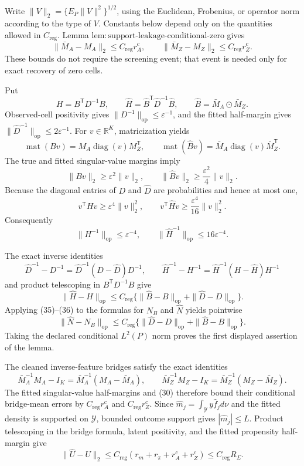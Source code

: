 Write \(\|V\|_2=\{E_P\|V\|^2\}^{1/2}\), using the Euclidean, Frobenius, or operator norm according to the type of \(V\).  Constants below depend only on the quantities allowed in \(C_{\mathrm{reg}}\).  Lemma \(\mathrm{lem{:}support\mbox{-}leakage\mbox{-}conditional\mbox{-}zero}\) gives
\[
 \|\bar M_A-M_A\|_2\leq C_{\mathrm{reg}}r_A^c,
 \qquad
 \|\bar M_Z-M_Z\|_2\leq C_{\mathrm{reg}}r_Z^c. \tag{30}
\]
These bounds do not require the screening event; that event is needed only for exact recovery of zero cells.

Put
\[
 H=B^{\mathsf T}D^{-1}B,\qquad
 \widehat H=\widehat B^{\mathsf T}\widehat D^{-1}\widehat B,
 \qquad \widehat B=\bar M_A\odot\bar M_Z. \tag{31}
\]
Observed-cell positivity gives \(\|D^{-1}\|_{\mathrm{op}}\leq\varepsilon^{-1}\), and the fitted half-margin gives \(\|\widehat D^{-1}\|_{\mathrm{op}}\leq2\varepsilon^{-1}\).  For \(v\in\mathbb R^K\), matricization yields
\[
 \operatorname{mat}(Bv)=M_A\operatorname{diag}(v)M_Z^{\mathsf T},
 \qquad
 \operatorname{mat}(\widehat Bv)=\bar M_A\operatorname{diag}(v)\bar M_Z^{\mathsf T}. \tag{32}
\]
The true and fitted singular-value margins imply
\[
 \|Bv\|_2\geq\varepsilon^2\|v\|_2,
 \qquad
 \|\widehat Bv\|_2\geq\frac{\varepsilon^2}{4}\|v\|_2. \tag{33}
\]
Because the diagonal entries of \(D\) and \(\widehat D\) are probabilities and hence at most one,
\[
 v^{\mathsf T}Hv\geq\varepsilon^4\|v\|_2^2,\qquad
 v^{\mathsf T}\widehat Hv\geq\frac{\varepsilon^4}{16}\|v\|_2^2.
\]
Consequently
\[
 \|H^{-1}\|_{\mathrm{op}}\leq\varepsilon^{-4},
 \qquad
 \|\widehat H^{-1}\|_{\mathrm{op}}\leq16\varepsilon^{-4}. \tag{34}
\]

The exact inverse identities
\[
 \widehat D^{-1}-D^{-1}=\widehat D^{-1}(D-\widehat D)D^{-1},
 \qquad
 \widehat H^{-1}-H^{-1}=\widehat H^{-1}(H-\widehat H)H^{-1} \tag{35}
\]
and product telescoping in \(B^{\mathsf T}D^{-1}B\) give
\[
 \|\widehat H-H\|_{\mathrm{op}}
 \leq C_{\mathrm{reg}}
 \{\|\widehat B-B\|_{\mathrm{op}}+\|\widehat D-D\|_{\mathrm{op}}\}. \tag{36}
\]
Applying (35)--(36) to the formulas for \(N_B\) and \(\widehat N\) yields pointwise
\[
 \|\widehat N-N_B\|_{\mathrm{op}}
 \leq C_{\mathrm{reg}}
 \{\|\widehat D-D\|_{\mathrm{op}}+\|\widehat B-B\|_{\mathrm{op}}\}. \tag{37}
\]
Taking the declared conditional \(L^2(P)\) norm proves the first displayed assertion of the lemma.

The cleaned inverse-feature bridges satisfy the exact identities
\[
 \bar M_A^{-1}M_A-I_K=\bar M_A^{-1}(M_A-\bar M_A),
 \qquad
 \bar M_Z^{-1}M_Z-I_K=\bar M_Z^{-1}(M_Z-\bar M_Z). \tag{38}
\]
The fitted singular-value half-margins and (30) therefore bound their conditional bridge-mean errors by \(C_{\mathrm{reg}}r_A^c\) and \(C_{\mathrm{reg}}r_Z^c\).  Since
\(\widehat m_j=\int_{\mathcal Y}y\widehat f_jd\nu\) and the fitted density is supported on \(\mathcal Y\), bounded outcome support gives \(|\widehat m_j|\leq L\).  Product telescoping in the bridge formula, latent positivity, and the fitted propensity half-margin give
\[
 \|\widehat U-U\|_2
 \leq C_{\mathrm{reg}}(r_m+r_\pi+r_A^c+r_Z^c)
 \leq C_{\mathrm{reg}}R_\Sigma. \tag{39}
\]

